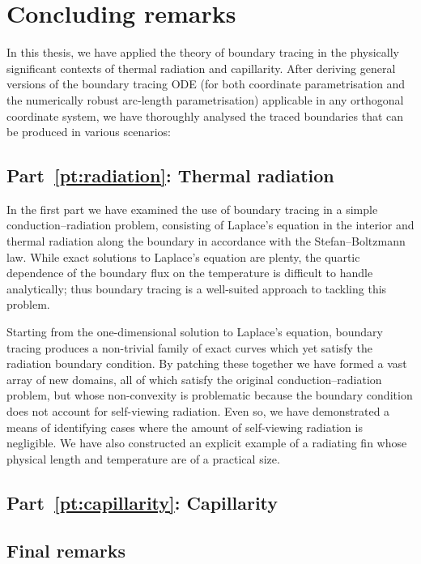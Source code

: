 \chapter{Concluding remarks}
\label{ch:concluding}

In this thesis,
we have applied the theory of boundary tracing
in the physically significant contexts
of thermal radiation and capillarity.
After deriving general versions of the boundary tracing ODE
(for both coordinate parametrisation
and the numerically robust arc-length parametrisation)
applicable in any orthogonal coordinate system,
we have thoroughly analysed
the traced boundaries that can be produced in various scenarios:

\section{Part~\ref*{pt:radiation}: Thermal radiation}
\label{sec:concluding.radiation}

In the first part we have examined the use of boundary tracing
in a simple conduction--radiation problem,
consisting of Laplace's equation in the interior
and thermal radiation along the boundary
in accordance with the Stefan--Boltzmann law.
While exact solutions to Laplace's equation are plenty,
the quartic dependence of the boundary flux on the temperature
is difficult to handle analytically;
thus boundary tracing is a well-suited approach to tackling this problem.

Starting from the one-dimensional solution to Laplace's equation,
boundary tracing produces a non-trivial family of exact curves
which yet satisfy the radiation boundary condition.
By patching these together
we have formed a vast array of new domains,
all of which satisfy the original conduction--radiation problem,
but whose non-convexity is problematic
because the boundary condition does not account for self-viewing radiation.
Even so, we have demonstrated a means of identifying cases
where the amount of self-viewing radiation is negligible.
We have also constructed an explicit example of a radiating fin
whose physical length and temperature are of a practical size.


\section{Part~\ref*{pt:capillarity}: Capillarity}
\label{sec:concluding.capillarity}

\section{Final remarks}
\label{sec:concluding.final}
